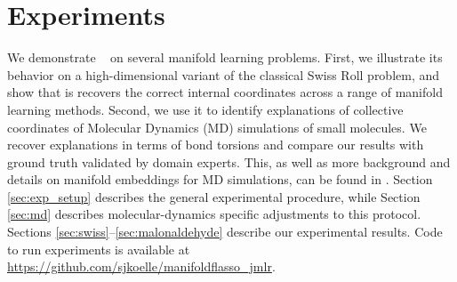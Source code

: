 \section{Experiments}
\label{sec:exps}

We demonstrate \ouralg~ on several manifold learning problems.
First, we illustrate its behavior on a high-dimensional variant of the classical Swiss Roll problem, and show that is recovers the correct internal coordinates across a range of manifold learning methods.  Second, we use it to identify explanations of collective coordinates of Molecular Dynamics (MD) simulations of small molecules. We recover explanations in terms of bond torsions and compare our results with ground truth validated by domain experts. This, as well as more background and details on manifold embeddings for MD simulations, can be found in \cite{ChenMcqueenKoelleMChmielaTkatchenko:mlcules-dum19}.
Section \ref{sec:exp_setup} describes the general experimental procedure, while Section \ref{sec:md} describes molecular-dynamics specific adjustments to this protocol.
Sections \ref{sec:swiss}--\ref{sec:malonaldehyde} describe our experimental results. Code to run experiments is available at \url{https://github.com/sjkoelle/manifoldflasso_jmlr}.



